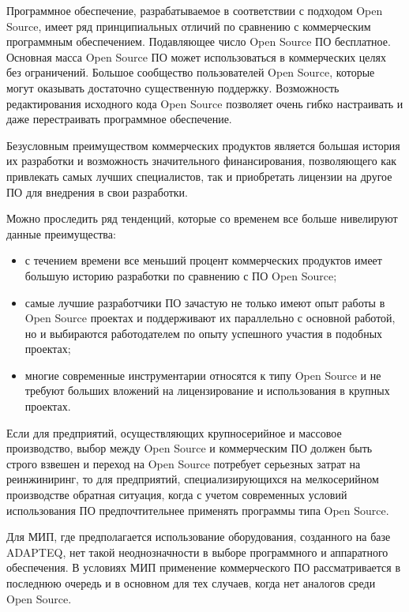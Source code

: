 Программное обеспечение, разрабатываемое в соответствии с подходом Open Source, имеет ряд принципиальных отличий по сравнению с коммерческим программным обеспечением. Подавляющее число Open Source ПО бесплатное. Основная масса Open Source ПО может использоваться в коммерческих целях без ограничений. Большое сообщество пользователей Open Source, которые могут оказывать достаточно существенную поддержку. Возможность редактирования исходного кода Open Source позволяет очень гибко настраивать и даже перестраивать программное обеспечение.

Безусловным преимуществом коммерческих продуктов является большая история их разработки и возможность значительного финансирования, позволяющего как привлекать самых лучших специалистов, так и приобретать лицензии на другое ПО для внедрения в свои разработки.

Можно проследить ряд тенденций, которые со временем все больше нивелируют данные преимущества:

\begin{itemize}
	\item с течением  времени все меньший процент коммерческих продуктов имеет большую историю разработки по сравнению с ПО Open Source;
	
	\item самые лучшие разработчики ПО зачастую не только имеют опыт работы в Open Source проектах и  поддерживают их параллельно с основной работой, но и выбираются работодателем по опыту успешного участия в подобных проектах;
	
	\item многие современные инструментарии относятся к типу Open Source и не требуют больших вложений на лицензирование и использования в крупных проектах.
\end{itemize}

Если для предприятий, осуществляющих крупносерийное и массовое производство, выбор между Open Source и коммерческим ПО должен быть строго взвешен и переход на Open Source потребует серьезных затрат на реинжиниринг, то для предприятий, специализирующихся на мелкосерийном производстве обратная ситуация, когда с учетом современных условий использования ПО предпочтительнее применять программы типа Open Source.

Для МИП, где предполагается использование оборудования, созданного на базе \foreignlanguage{english}{ADAPTEQ}, нет такой неоднозначности в выборе программного и аппаратного обеспечения. В условиях МИП применение коммерческого ПО рассматривается в последнюю очередь и в основном для тех случаев, когда нет аналогов среди Open Source.


